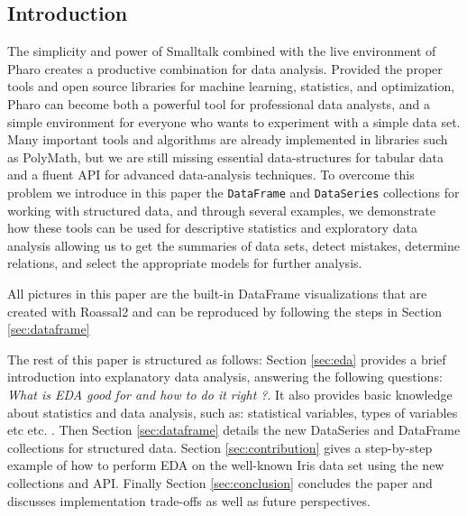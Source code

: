 \documentclass{article}
\makeatletter
\newcommand*{\etc}{%
    \@ifnextchar{.}%
        {etc}%
        {etc.\@\xspace}%
}
\makeatother
\begin{document}
\begin{multicols}{2}
\section{Introduction}
\label{sec:intro}

%
%
%
%

The simplicity and power of Smalltalk combined with the live environment of Pharo creates a productive combination for data analysis. 
Provided the proper tools and open source libraries for machine learning, statistics, and optimization, Pharo can become both a powerful tool for professional data analysts, and a simple environment for everyone who wants to experiment with a simple data set. Many important tools and algorithms are already implemented in libraries such as PolyMath, but we are still missing essential data-structures for tabular data and a fluent API for advanced data-analysis techniques. To overcome this problem we introduce in this paper the \texttt{DataFrame} and \texttt{DataSeries} collections for working with structured data, and through several examples, we demonstrate how these tools can be used for descriptive statistics and exploratory data analysis allowing us to get the summaries of data sets, detect mistakes, determine relations, and select the appropriate models for further analysis.

All pictures in this paper are the built-in DataFrame visualizations that are created with Roassal2 and can be reproduced by following the steps in Section \ref{sec:dataframe}

The rest of this paper is structured as follows: Section \ref{sec:eda} provides a brief introduction into explanatory data analysis, answering the following questions: \textit{What is EDA good for and how to do it right ?}. It also provides basic knowledge about statistics and data analysis, such as: statistical variables, types of variables \etc. Then Section \ref{sec:dataframe} details the new DataSeries and DataFrame collections for structured data. Section \ref{sec:contribution} gives a step-by-step example of how to perform EDA on the well-known Iris data set using the new collections and API. Finally Section \ref{sec:conclusion} concludes the paper and discusses implementation trade-offs as well as future perspectives.





\end{multicols}
\end{document}
